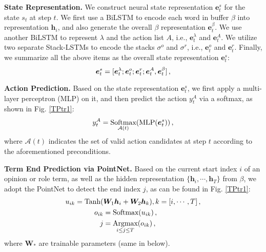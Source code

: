 \documentclass[letterpaper]{article} \usepackage{aaai22}  \usepackage{times}  \usepackage{helvet}  \usepackage{courier}  \usepackage[hyphens]{url}  \usepackage{graphicx} \urlstyle{rm} \def\UrlFont{\rm}  \usepackage{natbib}  \usepackage{caption} \DeclareCaptionStyle{ruled}{labelfont=normalfont,labelsep=colon,strut=off} \frenchspacing  \setlength{\pdfpagewidth}{8.5in}  \setlength{\pdfpageheight}{11in}  \usepackage{algorithm}
\begin{document}
\noindent\textbf{State Representation.}
We construct neural state representation $\bm{e}_t^s$ for the state $s_t$ at step $t$.
We first use a BiLSTM to encode each word in buffer $\beta$ into representation $\bm{h}_i$, and also generate the overall $\beta$ representation $\bm{e}^{\beta}_{t}$.
We use another BiLSTM to represent $\lambda$ and the action list $A$, i.e., $\bm{e}^{\lambda}_t$ and  $\bm{e}^{A}_{t}$.
We utilize two separate Stack-LSTMs to encode the stacks $\sigma^o$ and $\sigma^r$, i.e., $\bm{e}^{o}_t$ and $\bm{e}^{r}_t$.
Finally, we summarize all the above items as the overall state representation $\bm{e}_t^{s}$:
\begin{equation}
\setlength\abovedisplayskip{2pt}
\setlength\belowdisplayskip{2pt}
\bm{e}_t^{s} = [\bm{e}^{\lambda}_t; \bm{e}^{o}_t; \bm{e}^{r}_t; \bm{e}^{A}_{t}, \bm{e}^{\beta}_{t}] \,,
\end{equation}











\noindent\textbf{Action Prediction.}
Based on the state representation $\bm{e}_t^{s}$, we first apply a multi-layer perceptron (MLP) on it, and then predict the action $y_t^A$ via a softmax, as shown in Fig. \ref{TPtr1}:
\begin{equation}
\setlength\abovedisplayskip{2pt}
\setlength\belowdisplayskip{2pt}
y_t^A = \mathop{\text{Softmax}}\limits_{\mathcal{A}(t)}(\text{MLP}(\bm{e}_t^{s}))\,,
\end{equation}
where $\mathcal{A}(t)$ indicates the set of valid action candidates at step $t$ according to the aforementioned preconditions.














\noindent\textbf{Term End Prediction via PointNet.}
Based on the current start index $i$ of an opinion or role term, as well as the hidden representation $\{\bm{h}_i,\cdots, \bm{h}_T\}$ from $\beta$, 
we adopt the PointNet to detect the end index $j$, as can be found in Fig. \ref{TPtr1}:
\begin{align}
\setlength\abovedisplayskip{3pt}
\setlength\belowdisplayskip{3pt}
\label{uik} u_{ik}  = \text{Tanh}(&\bm{W}_1\bm{h}_{i} + \bm{W}_2\bm{h}_k), k=[i,\cdots, T] \,, \\
\label{oik} o_{ik} &= \text{Softmax}(u_{ik}) \,, \\
\label{index j} j &= \mathop{\text{Argmax}}\limits_{i \le  j \le T}(o_{ik}) \,, 
\end{align}
where $\bm{W}_{*}$ are trainable parameters (same in below).
\end{document}
